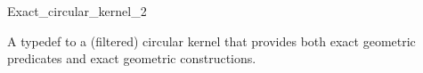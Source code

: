 \begin{ccRefClass}{Exact_circular_kernel_2}

\ccDefinition

A typedef to a (filtered) circular kernel that provides
both exact geometric predicates and exact geometric constructions.


\ccIsModel


\end{ccRefClass}
